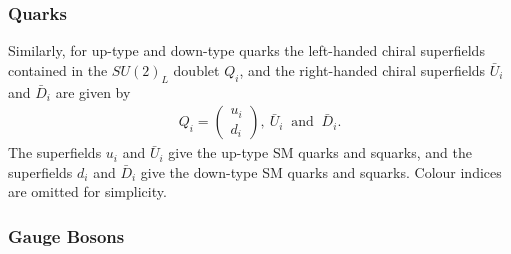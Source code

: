 \documentclass[twoside,english]{uiofysmaster}
\begin{document}
\subsubsection{Quarks}

Similarly, for up-type and down-type quarks the left-handed chiral superfields contained in the $SU(2)_L$ doublet $Q_i$,  and the right-handed chiral superfields $\bar{U}_i$ and $\bar{D}_i$ are given by
\begin{align}
Q_i = \begin{pmatrix}
u_i\\
d_i
\end{pmatrix},
~ \bar{U}_i ~ \text{ and }~ \bar{D}_i.
\end{align}
The superfields $u_i$ and $\bar{U}_i$ give the up-type SM quarks and squarks, and the superfields $d_i$ and $\bar{D}_i$ give the down-type SM quarks and squarks. Colour indices are omitted for simplicity.

\subsubsection{Gauge Bosons}
\end{document}
